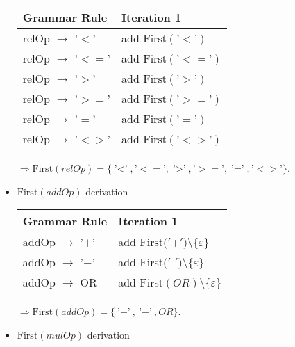 \documentclass[8pt]{scrartcl}
\newcommand{\First}[1]{\mathrm{First}(#1)}
\newcommand{\epsset}{\{\varepsilon\}}
\begin{document}
\begin{itemize}
                \begin{tabular}{|l |l |}
                    \hline
                    \textbf{Grammar Rule} & \textbf{Iteration 1}\\
                    \hline
                    relOp $\rightarrow$ '$<$' & add $\First{\text{'$<$'}}$\\
                    \hline
                    relOp $\rightarrow$ '$<=$' & add $\First{\text{'$<=$'}}$\\
                    \hline
                    relOp $\rightarrow$ '$>$' & add $\First{\text{'$>$'}}$\\
                    \hline
                    relOp $\rightarrow$ '$>=$' & add $\First{\text{'$>=$'}}$\\
                    \hline
                    relOp $\rightarrow$ '$=$' & add $\First{\text{'$=$'}}$\\
                    \hline
                    relOp $\rightarrow$ '$<>$' & add $\First{\text{'$<>$'}}$\\
                    \hline
                \end{tabular}\newline
                $\Rightarrow \First{relOp} = \{\text{'$<$'}, \text{'$<=$'}, \text{'$>$'}, \text{'$>=$'}, \text{'$=$'}, \text{'$<>$'}\}$.
            \item $\First{addOp}$ derivation\newline
                \begin{tabular}{|l |l |}
                    \hline
                    \textbf{Grammar Rule} & \textbf{Iteration 1}\\
                    \hline
                    addOp $\rightarrow$ '$+$' & add $\First{'$+$'} \setminus \epsset$\\
                    \hline
                    addOp $\rightarrow$ '$-$' & add $\First{'$-$'} \setminus \epsset$\\
                    \hline
                    addOp $\rightarrow$ OR & add $\First{OR} \setminus \epsset$\\
                    \hline
                \end{tabular}\newline
                $\Rightarrow \First{addOp} = \{\text{'$+$'}, \text{'$-$'}, OR\}$.
            \item $\First{mulOp}$ derivation\newline
                \begin{tabular}{|l |l |}

\end{tabular}
\end{itemize}
\end{document}
